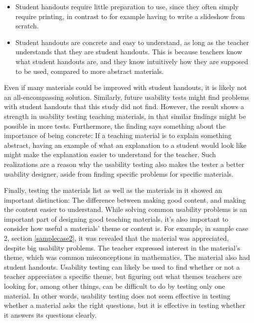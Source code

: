 \begin{itemize}
	\item Student handouts require little preparation to use, since they often simply require printing, in contrast to for example having to write a slideshow from scratch.
	\item Student handouts are concrete and easy to understand, as long as the teacher understands that they are student handouts. This is because teachers know what student handouts are, and they know intuitively how they are supposed to be used, compared to more abstract materials.
\end{itemize}
\newpage
Even if many materials could be improved with student handouts, it is likely not an all-encompassing solution. Similarly, future usability tests might find problems with student handouts that this study did not find. However, the result shows a strength in usability testing teaching materials, in that similar findings might be possible in more tests. Furthermore, the finding says something about the importance of being concrete: If a teaching material is to explain something abstract, having an example of what an explanation to a student would look like might make the explanation easier to understand for the teacher. Such realizations are a reason why the usability testing also makes the tester a better usability designer, aside from finding specific problems for specific materials.

Finally, testing the materials list as well as the materials in it showed an important distinction: The difference between making good content, and making the content easier to understand. While solving common usability problems is an important part of designing good teaching materials, it's also important to consider how useful a materials' theme or content is. For example, in sample case 2, section \ref{samplecase2}, it was revealed that the material was appreciated, despite big usability problems. The teacher expressed interest in the material's theme, which was common misconceptions in mathematics. The material also had student handouts. Usability testing can likely be used to find whether or not a teacher appreciates a specific theme, but figuring out what themes teachers are looking for, among other things, can be difficult to do by testing only one material. In other words, usability testing does not seem effective in testing whether a material asks the right questions, but it is effective in testing whether it answers its questions clearly.

